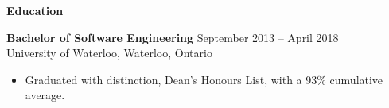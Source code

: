 \documentclass{letter}
\begin{document}
{\bfseries \Large Education}

\vspace{-10mm}
\null\hrulefill

\vspace{-1.5mm}
{\bfseries Bachelor of Software Engineering} \hfill September 2013 -- April
2018\\
University of Waterloo, Waterloo, Ontario
\vspace{-3mm}
\begin{itemize}
    \item Graduated with distinction, Dean's Honours List, with a 93\% cumulative average.
\end{itemize}
\end{document}
